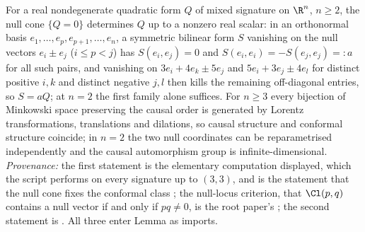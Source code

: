 For a real nondegenerate quadratic form $Q$ of mixed signature on $\R^{n}$, $n \geq 2$, the null cone $\{Q = 0\}$ determines $Q$ up to a nonzero real scalar: in an orthonormal basis $e_{1}, \dots, e_{p}, e_{p+1}, \dots, e_{n}$, a symmetric bilinear form $S$ vanishing on the null vectors $e_{i} \pm e_{j}$ ($i \leq p < j$) has $S(e_{i}, e_{j}) = 0$ and $S(e_{i}, e_{i}) = -S(e_{j}, e_{j}) =: a$ for all such pairs, and vanishing on $3e_{i} + 4e_{k} \pm 5e_{j}$ and $5e_{i} + 3e_{j} \pm 4e_{l}$ for distinct positive $i, k$ and distinct negative $j, l$ then kills the remaining off-diagonal entries, so $S = aQ$; at $n = 2$ the first family alone suffices. For $n \geq 3$ every bijection of Minkowski space preserving the causal order is generated by Lorentz transformations, translations and dilations, so causal structure and conformal structure coincide; in $n = 2$ the two null coordinates can be reparametrised independently and the causal automorphism group is infinite-dimensional. \emph{Provenance:} the first statement is the elementary computation displayed, which the script performs on every signature up to $(3,3)$, and is the statement that the null cone fixes the conformal class \cite{HawkingEllis1973}; the null-locus criterion, that $\Cl(p,q)$ contains a null vector if and only if $pq \neq 0$, is the root paper's \cite[Prop.~3.3]{ButlerT1}; the second statement is \cite{Zeeman1964}. All three enter Lemma  as imports.
